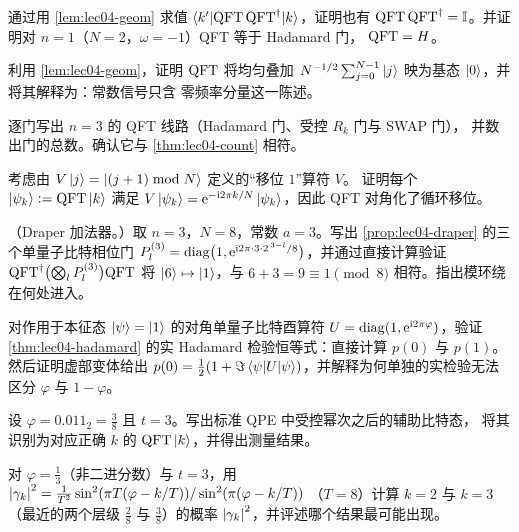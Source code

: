 \begin{exercise}\label{ex:lec04-2}
通过用 \cref{lem:lec04-geom} 求值 $\braket{k'|\mathrm{QFT}\,\mathrm{QFT}^{\dagger}|k}$，证明也有
$\mathrm{QFT}\,\mathrm{QFT}^{\dagger}=\mathbb{I}$。并证明对 $n=1$（$N=2$，$\omega=-1$）QFT 等于 Hadamard 门，
$\mathrm{QFT}=H$。
\end{exercise}

\begin{exercise}\label{ex:lec04-3}
利用 \cref{lem:lec04-geom}，证明 $\mathrm{QFT}$ 将均匀叠加
$N^{-1/2}\sum_{j=0}^{N-1}\ket{j}$ 映为基态 $\ket{0}$，并将其解释为：常数信号只含
零频率分量这一陈述。
\end{exercise}

\begin{exercise}\label{ex:lec04-4}
逐门写出 $n=3$ 的 QFT 线路（Hadamard 门、受控 $R_k$ 门与 SWAP 门），
并数出门的总数。确认它与 \cref{thm:lec04-count} 相符。
\end{exercise}

\begin{exercise}\label{ex:lec04-5}
考虑由 $V\ket{j}=\ket{(j+1)\bmod N}$ 定义的``移位 $1$''算符 $V$。
证明每个 $\ket{\psi_k}\vcentcolon=\mathrm{QFT}\ket{k}$ 满足
$V\ket{\psi_k}=\mathrm{e}^{-\mathrm{i} 2\pi k/N}\ket{\psi_k}$，因此 QFT 对角化了循环移位。
\end{exercise}

\begin{exercise}\label{ex:lec04-draper}
（Draper 加法器。）取 $n=3$，$N=8$，常数 $a=3$。写出 \cref{prop:lec04-draper}
的三个单量子比特相位门 $P_l^{(3)}=\operatorname{diag}\bigl(1,\mathrm{e}^{\mathrm{i} 2\pi\cdot 3\cdot
2^{\,3-l}/8}\bigr)$，并通过直接计算验证
$\mathrm{QFT}^{\dagger}\bigl(\bigotimes_{l}P_l^{(3)}\bigr)\mathrm{QFT}$ 将
$\ket{6}\mapsto\ket{1}$，与 $6+3=9\equiv1\pmod 8$ 相符。指出模环绕在何处进入。
\end{exercise}

\begin{exercise}\label{ex:lec04-6}
对作用于本征态 $\ket{\psi}=\ket{1}$ 的对角单量子比特酉算符
$U=\operatorname{diag}(1,\mathrm{e}^{\mathrm{i} 2\pi\varphi})$，验证 \cref{thm:lec04-hadamard} 的实
Hadamard 检验恒等式：直接计算 $p(0)$ 与 $p(1)$。然后证明虚部变体给出
$p(0)=\tfrac12(1+\Im\braket{\psi|U|\psi})$，并解释为何单独的实检验无法区分
$\varphi$ 与 $1-\varphi$。
\end{exercise}

\begin{exercise}\label{ex:lec04-7}
设 $\varphi=0.011_2=\tfrac38$ 且 $t=3$。写出标准 QPE 中受控幂次之后的辅助比特态，
将其识别为对应正确 $k$ 的 $\mathrm{QFT}\ket{k}$，并得出测量结果。
\end{exercise}

\begin{exercise}\label{ex:lec04-8}
对 $\varphi=\tfrac13$（非二进分数）与 $t=3$，用 $\left\lvert \gamma_k \right\rvert^{2}
=\tfrac{1}{T^{2}}\sin^{2}(\pi T(\varphi-k/T))/\sin^{2}(\pi(\varphi-k/T))$
（$T=8$）计算 $k=2$ 与 $k=3$（最近的两个层级 $\tfrac28$ 与 $\tfrac38$）的概率
$\left\lvert \gamma_k \right\rvert^{2}$，并评述哪个结果最可能出现。
\end{exercise}

